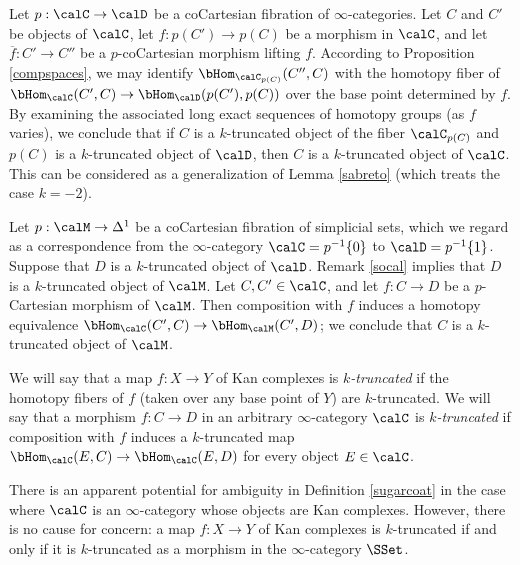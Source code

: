 \begin{remark}\label{socal}
Let $p: \calC \rightarrow \calD$ be a coCartesian fibration of $\infty$-categories.
Let $C$ and $C'$ be objects of $\calC$, let $f: p(C') \rightarrow p(C)$ be a morphism in $\calC$,
and let $\overline{f}: C' \rightarrow C''$ be a $p$-coCartesian morphism lifting $f$.
According to Proposition \ref{compspaces}, we may identify $\bHom_{\calC_{p(C)}}(C'',C)$ with the homotopy fiber of $\bHom_{\calC}(C',C) \rightarrow \bHom_{\calD}(p(C'), p(C))$ over the base point determined by $f$.
By examining the associated long exact sequences of homotopy groups (as $f$ varies), we conclude that if $C$ is a $k$-truncated object of the fiber $\calC_{p(C)}$ and 
$p(C)$ is a $k$-truncated object of $\calD$, then $C$ is a $k$-truncated object of $\calC$. This can be considered as a generalization of Lemma \ref{sabreto} (which treats the case $k=-2$).
\end{remark}

\begin{remark}\label{trumble}
Let $p: \calM \rightarrow \Delta^1$ be a coCartesian fibration of simplicial sets, which we regard as
a correspondence from the $\infty$-category $\calC = p^{-1} \{0\}$ to $\calD = p^{-1} \{1\}$. 
Suppose that $D$ is a $k$-truncated object of $\calD$. Remark \ref{socal} implies that $D$ is a $k$-truncated object of $\calM$. Let $C,C' \in \calC$, and let $f: C \rightarrow D$ be a $p$-Cartesian morphism of $\calM$. Then composition with $f$ induces a homotopy equivalence
$ \bHom_{\calC}(C',C) \rightarrow \bHom_{\calM}(C',D)$; we conclude that $C$ is a $k$-truncated object of $\calM$.
\end{remark}

\begin{definition}\label{sugarcoat}
We will say that a map $f: X \rightarrow Y$ of Kan complexes is {\it $k$-truncated} if the homotopy
fibers of $f$ (taken over any base point of $Y$) are $k$-truncated. We will say that a morphism
$f: C \rightarrow D$ in an arbitrary $\infty$-category $\calC$ is {\it $k$-truncated}
if composition with $f$ induces a $k$-truncated map
$\bHom_{\calC}(E,C) \rightarrow \bHom_{\calC}(E,D)$
for every object $E \in \calC$.
\end{definition}

\begin{remark}
There is an apparent potential for ambiguity in Definition \ref{sugarcoat} in the case where
$\calC$ is an $\infty$-category whose objects are Kan complexes. However, there is no cause for concern: a map $f: X \rightarrow Y$ of Kan complexes is $k$-truncated if and only if it is $k$-truncated as a morphism in the $\infty$-category $\SSet$.
\end{remark}


